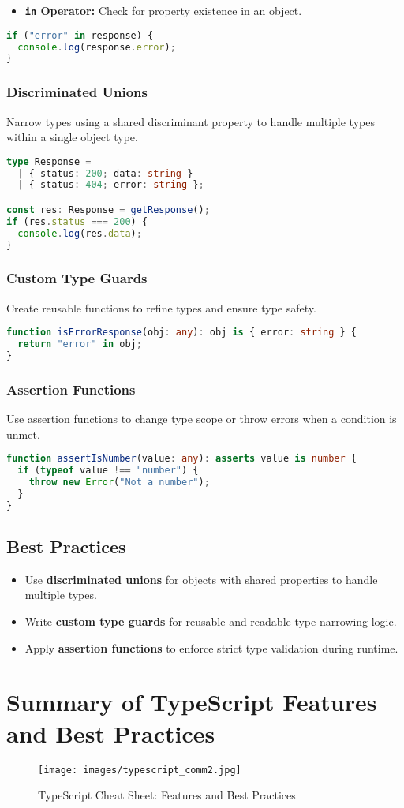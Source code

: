 \documentclass[a4paper,12pt]{article}
\begin{document}
\begin{itemize}
    \item \textbf{\texttt{in} Operator:} Check for property existence in an object.
\end{itemize}
\begin{lstlisting}[language=TypeScript]
if ("error" in response) {
  console.log(response.error);
}
\end{lstlisting}

\subsubsection*{Discriminated Unions}
Narrow types using a shared discriminant property to handle multiple types within a single object type.

\begin{lstlisting}[language=TypeScript]
type Response =
  | { status: 200; data: string }
  | { status: 404; error: string };

const res: Response = getResponse();
if (res.status === 200) {
  console.log(res.data);
}
\end{lstlisting}

\subsubsection*{Custom Type Guards}
Create reusable functions to refine types and ensure type safety.
\begin{lstlisting}[language=TypeScript]
function isErrorResponse(obj: any): obj is { error: string } {
  return "error" in obj;
}
\end{lstlisting}

\subsubsection*{Assertion Functions}
Use assertion functions to change type scope or throw errors when a condition is unmet.
\begin{lstlisting}[language=TypeScript]
function assertIsNumber(value: any): asserts value is number {
  if (typeof value !== "number") {
    throw new Error("Not a number");
  }
}
\end{lstlisting}

\subsection*{Best Practices}
\begin{itemize}
    \item Use \textbf{discriminated unions} for objects with shared properties to handle multiple types.
    \item Write \textbf{custom type guards} for reusable and readable type narrowing logic.
    \item Apply \textbf{assertion functions} to enforce strict type validation during runtime.
\end{itemize}

\section{Summary of TypeScript Features and Best Practices}
\noindent
\begin{figure}[h!]
    \centering
    \texttt{[image: images/typescript\_comm2.jpg]}
    \caption{TypeScript Cheat Sheet: Features and Best Practices}
    \label{fig:Typescipt_Cheat_Sheet.}
\end{figure}
\end{document}
